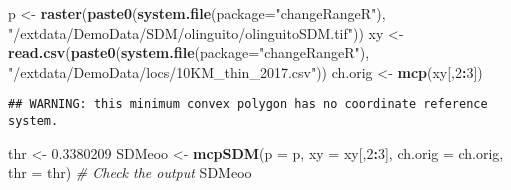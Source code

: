 \documentclass[
]{article}
\newenvironment{Shaded}{\begin{snugshade}}{\end{snugshade}}
\newcommand{\CommentTok}[1]{\textcolor[rgb]{0.56,0.35,0.01}{\textit{#1}}}
\newcommand{\DataTypeTok}[1]{\textcolor[rgb]{0.13,0.29,0.53}{#1}}
\newcommand{\DecValTok}[1]{\textcolor[rgb]{0.00,0.00,0.81}{#1}}
\newcommand{\FloatTok}[1]{\textcolor[rgb]{0.00,0.00,0.81}{#1}}
\newcommand{\KeywordTok}[1]{\textcolor[rgb]{0.13,0.29,0.53}{\textbf{#1}}}
\newcommand{\NormalTok}[1]{#1}
\newcommand{\OperatorTok}[1]{\textcolor[rgb]{0.81,0.36,0.00}{\textbf{#1}}}
\newcommand{\StringTok}[1]{\textcolor[rgb]{0.31,0.60,0.02}{#1}}
\begin{document}
\begin{Shaded}
\begin{Highlighting}[]
\NormalTok{p <-}\StringTok{ }\KeywordTok{raster}\NormalTok{(}\KeywordTok{paste0}\NormalTok{(}\KeywordTok{system.file}\NormalTok{(}\DataTypeTok{package=}\StringTok{"changeRangeR"}\NormalTok{), }\StringTok{"/extdata/DemoData/SDM/olinguito/olinguitoSDM.tif"}\NormalTok{))}
\NormalTok{xy <-}\StringTok{ }\KeywordTok{read.csv}\NormalTok{(}\KeywordTok{paste0}\NormalTok{(}\KeywordTok{system.file}\NormalTok{(}\DataTypeTok{package=}\StringTok{"changeRangeR"}\NormalTok{), }\StringTok{"/extdata/DemoData/locs/10KM_thin_2017.csv"}\NormalTok{))}
\NormalTok{ch.orig <-}\StringTok{ }\KeywordTok{mcp}\NormalTok{(xy[,}\DecValTok{2}\OperatorTok{:}\DecValTok{3}\NormalTok{])}
\end{Highlighting}
\end{Shaded}

\begin{verbatim}
## WARNING: this minimum convex polygon has no coordinate reference system.
\end{verbatim}

\begin{Shaded}
\begin{Highlighting}[]
\NormalTok{thr <-}\StringTok{ }\FloatTok{0.3380209}
\NormalTok{SDMeoo <-}\StringTok{ }\KeywordTok{mcpSDM}\NormalTok{(}\DataTypeTok{p =}\NormalTok{ p, }\DataTypeTok{xy =}\NormalTok{ xy[,}\DecValTok{2}\OperatorTok{:}\DecValTok{3}\NormalTok{], }\DataTypeTok{ch.orig =}\NormalTok{ ch.orig, }\DataTypeTok{thr =}\NormalTok{ thr)}
\CommentTok{# Check the output}
\NormalTok{SDMeoo}
\end{Highlighting}
\end{Shaded}
\end{document}
